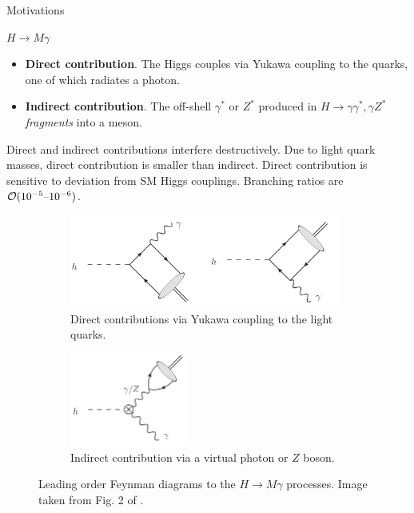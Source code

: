 \documentclass[9pt,aspectratio=1610]{beamer}
\begin{document}
\begin{frame}{Motivations}
	
	\(H \rightarrow M \gamma \) \cite{K_nig_2015}
	\begin{itemize}
		\item \textbf{Direct contribution}. The Higgs couples via Yukawa coupling to the quarks, one of which radiates a photon.
		\item \textbf{Indirect contribution}. The off-shell \(\gamma^*\) or \(Z^*\) produced in \(H\rightarrow \gamma\gamma^*, \gamma Z^*\) \textit{fragments} into a meson.
	\end{itemize}
	Direct and indirect contributions interfere destructively. Due to light quark masses, direct contribution is smaller than indirect. Direct contribution is sensitive to deviation from SM Higgs couplings. Branching ratios are \(\mathcal{O}(10^{-5}\textup{--}10^{-6})\).
	\begin{figure}[t!]
		\centering
		\begin{subfigure}[t]{0.48\linewidth}
			\centering
			\includegraphics[height=1.2in]{figures/Higgs_phirhoomega_direct.png}
			\caption{Direct contributions via Yukawa coupling to the light quarks.}
		\end{subfigure}
		\hfill
		\begin{subfigure}[t]{0.48\linewidth}
			\centering
			\includegraphics[height=1.2in]{figures/Higgs_phirhoomega_indirect.png}
			\caption{Indirect contribution via a virtual photon or \(Z\) boson.}
		\end{subfigure}
		\caption{Leading order Feynman diagrams to the \(H\rightarrow M\gamma\) processes. Image taken from Fig. 2 of \cite{K_nig_2015}.}
	\end{figure}
\end{frame}
\end{document}
